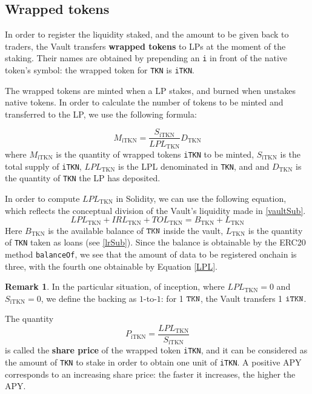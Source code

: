 \documentclass[a4paper,10 pt]{article}
\theoremstyle{definition}
\newtheorem{remark}{Remark}
\begin{document}
\subsection{Wrapped tokens}\label{wtSub}

In order to register the liquidity staked, and the amount to be given back to traders, the Vault transfers {\bf wrapped tokens} to LPs at the moment of the staking.
Their names are obtained by prepending an \verb|i| in front of the native token's symbol: the wrapped token for \verb|TKN| is \verb|iTKN|.

The wrapped tokens are minted when a LP stakes, and burned when unstakes native tokens. In order to calculate the number of tokens to be minted and transferred to the LP, we use the following formula:

\begin{equation}\label{wrappedtokens}
M_{\text{iTKN}} = \frac{S_{\text{iTKN}}}{LPL_{\text{TKN}}}D_{\text{TKN}}
\end{equation}
where $M_{\text{iTKN}}$ is the quantity of wrapped tokens \verb|iTKN| to be minted, $S_{\text{iTKN}}$ is the total supply of \verb|iTKN|, $LPL_{\text{TKN}}$ is the LPL denominated in \verb|TKN|, and  and $D_\text{TKN}$ is the quantity of \verb|TKN| the LP has deposited. 

In order to compute $LPL_{\text{TKN}}$ in Solidity, we can use the following equation, which reflects the conceptual division of the Vault's liquidity made in \ref{vaultSub}.
\begin{equation}\label{LPL}
LPL_\text{TKN} + IRL_{\text{TKN}} + TOL_{\text{TKN}} = B_{\text{TKN}} + L_{\text{TKN}}
\end{equation}
Here $B_{\text{TKN}}$ is the available balance of $\verb|TKN|$ inside the vault, $L_{\text{TKN}}$ is the quantity of \verb|TKN| taken as loans (see \ref{lrSub}). Since the balance is obtainable by the ERC20 method \verb|balanceOf|, we see that the amount of data to be registered onchain is three, with the fourth one obtainable by Equation \eqref{LPL}.

\begin{remark}
In the particular situation, of inception, where $LPL_{\text{TKN}} = 0$ and $S_{\text{iTKN}} = 0$, we define the backing as $1$-to-$1$: for 1 $\verb|TKN|$, the Vault transfers 1 $\verb|iTKN|$.
\end{remark}

The quantity 
\begin{equation}\label{shareprice}
P_{\text{iTKN}} = \frac{LPL_{\text{TKN}}}{S_{\text{iTKN}}}
\end{equation} 
is called the {\bf share price} of the wrapped token \verb|iTKN|, and it can be considered as the amount of \verb|TKN| to stake in order to obtain one unit of \verb|iTKN|. A positive APY corresponds to an increasing share price: the faster it increases, the higher the APY.
\end{document}
